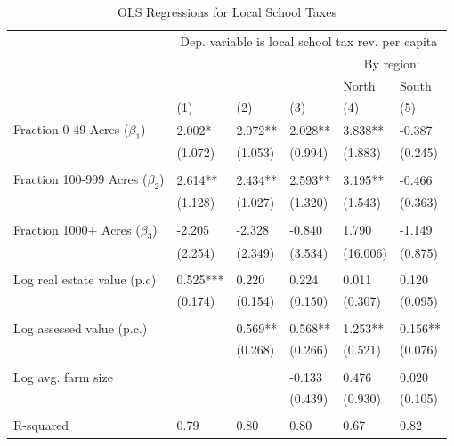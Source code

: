 \documentclass[11pt]{article}
\begin{document}
\clearpage %

\begin{table}[!htb]
\caption{OLS Regressions for Local School Taxes}\label{ivtable_B}
\par
\begin{center}
{\footnotesize
\begin{tabularx}{\textwidth}{lXXXXX}
\toprule
            & \multicolumn{5}{c}{Dep. variable is local school tax rev. per capita} \\
            &           &        &      & \multicolumn{2}{c}{By region:} \\ \cmidrule(lr){5-6}
            &           &        &      & North & South \\
            &     (1)   &    (2) & (3)  & (4) & (5)  \\            
           \midrule
Fraction 0-49 Acres ($\beta_1$)  &  2.002*  & 2.072** & 2.028** & 3.838** & -0.387 \\
             &  (1.072) & (1.053) & (0.994) & (1.883) & (0.245) \\ \\
Fraction 100-999 Acres ($\beta_2$) &  2.614** & 2.434** & 2.593** & 3.195** & -0.466 \\
             &  (1.128) & (1.027) & (1.320) & (1.543) & (0.363) \\ \\
Fraction 1000+ Acres ($\beta_3$)  &  -2.205  & -2.328 & -0.840   & 1.790   & -1.149 \\
             &  (2.254) & (2.349) & (3.534) & (16.006)& (0.875)  \\ \\
Log real estate value (p.c) &  0.525***& 0.220  & 0.224    & 0.011   & 0.120 \\
                   &  (0.174) & (0.154)& (0.150)  & (0.307) & (0.095) \\ \\
Log assessed value (p.c.) &          & 0.569**& 0.568**  & 1.253** & 0.156** \\
                   &          & (0.268)& (0.266)  & (0.521) & (0.076) \\ \\
Log avg. farm size &         &        & -0.133   & 0.476   & 0.020 \\
                   &          &        & (0.439)  & (0.930) & (0.105) \\ \\
R-squared          &  0.79 & 0.80 & 0.80 & 0.67& 0.82  \\

\end{tabularx}}
\end{center}
\end{table}
\end{document}
